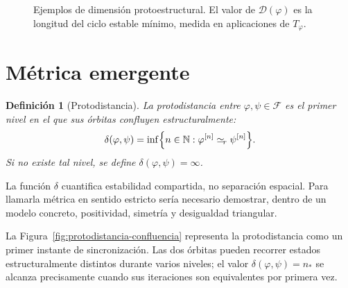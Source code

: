 \documentclass[11pt]{article}
\numberwithin{equation}{section}
\theoremstyle{prism}
\newtheorem{definicion}{Definición}
\newcommand{\F}{\mathcal{F}}
\newcommand{\N}{\mathbb{N}}
\newcommand{\iter}[2]{#1^{[#2]}}
\newcommand{\peq}{\simeq_{\!r}}
\begin{document}
\begin{figure}[htbp]
  \caption{Ejemplos de dimensión protoestructural. El valor de
  $\mathcal D(\varphi)$ es la longitud del ciclo estable mínimo, medida en
  aplicaciones de $T_{\varphi}$.}
  \label{fig:dimension-recurrente}
\end{figure}

\FloatBarrier
\section{Métrica emergente}

\begin{definicion}[Protodistancia]
La protodistancia entre $\varphi,\psi\in\F$ es el primer nivel en el que sus
órbitas confluyen estructuralmente:
\begin{equation}
  \delta(\varphi,\psi)
  =\inf\Bigl\{n\in\N:
  \iter{\varphi}{n}\peq\iter{\psi}{n}\Bigr\}.
  \label{eq:distancia}
\end{equation}
Si no existe tal nivel, se define $\delta(\varphi,\psi)=\infty$.
\end{definicion}

La función $\delta$ cuantifica estabilidad compartida, no separación espacial.
Para llamarla métrica en sentido estricto sería necesario demostrar, dentro de
un modelo concreto, positividad, simetría y desigualdad triangular.

La Figura~\ref{fig:protodistancia-confluencia} representa la protodistancia como
un primer instante de sincronización. Las dos órbitas pueden recorrer estados
estructuralmente distintos durante varios niveles; el valor
$\delta(\varphi,\psi)=n_{*}$ se alcanza precisamente cuando sus iteraciones son
equivalentes por primera vez.
\end{document}
